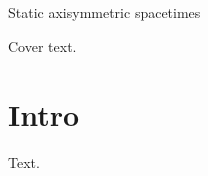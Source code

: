\documentclass{article}
\makeatletter
\def\title#1{\gdef\@title{#1}\centerline{#1}}
\makeatother
\begin{document}
\begin{titlepage}
\title{Static axisymmetric spacetimes}
Cover text.
\end{titlepage}
\section{Intro}
Text.
\end{document}
